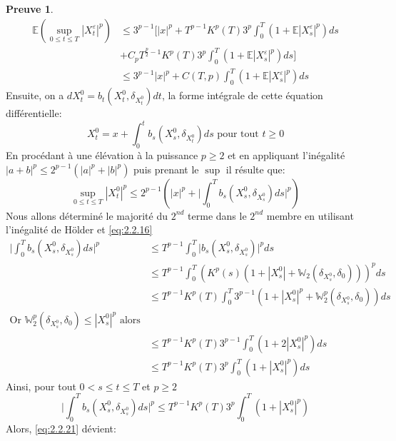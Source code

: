 \documentclass[12pt,a4paper,twoside,fleqn]{book}%
\theoremstyle{definition}
\newtheorem*{pr}{\textbf{Preuve}}
\theoremstyle{lemme}
\numberwithin{equation}{section}
\begin{document}
\begin{pr}
\begin{equation}\label{eq:2.2.20}
\begin{aligned}
\mathbb{E}\left(\sup_{0\leq t \leq T}|X_t^\varepsilon|^p\right) &\leq 3^{p-1}\Big[|x|^p +T^{p-1}K^p(T)3^{p}\int_{0}^{T}\left(1 + \mathbb{E}|X_s^\varepsilon|^p\right)ds\\&+  C_p T^{\frac{p}{2}-1}K^p(T)3^{p}\int_{0}^{T}\left(1 + \mathbb{E}|X_s^\varepsilon|^p\right)ds \Big]\\
&\leq  3^{p-1}|x|^p + C(T,p)\int_{0}^{T}\left(1 + \mathbb{E}|X_s^\varepsilon|^p\right)ds
\end{aligned}
\end{equation}
Ensuite, on a $ dX_t^0 = b_t(X_t^0,\delta_{X_t^0})dt$, la forme intégrale de cette équation différentielle:
\[
X_t^0 = x + \int_{0}^{t}b_s(X_s^0,\delta_{X_t^0})ds\text{ pour tout $t\geq 0$}
\]
En procédant à une élévation à la puissance $p\geq 2$ et en appliquant l'inégalité $|a+b|^p\leq 2^{p-1}(|a|^p + |b|^p)$ puis prenant le $\sup $ il résulte que:
\begin{equation}\label{eq:2.2.21}
	\sup_{0\leq t \leq T}|X_t^0|^p \leq 2^{p-1}\left(|x|^p + \Big|\int_{0}^{T}b_s(X_s^0,\delta_{X_s^0})ds\Big|^p\right)
\end{equation}
Nous allons déterminé le majorité du $2^{nd}$ terme dans le $2^{nd}$ membre en utilisant l'inégalité de Hölder et \ref{eq:2.2.16}
\[
\begin{aligned}
\Big|\int_{0}^{T}b_s(X_s^0,\delta_{X_s^0})ds\Big|^p&\leq T^{p-1}\int_{0}^{T}\Big|b_s(X_s^0,\delta_{X_s^0})\Big|^p ds\\
&\leq  T^{p-1}\int_{0}^{T}\left(K^p(s)(1 +|X_s^0| + \mathbb{W}_2(\delta_{X_s^0},\delta_0))\right)^pds\\
&\leq  T^{p-1}K^p(T)\int_{0}^{T}3^{p-1}\left(1 + |X_s^0|^p + \mathbb{W}_2^p(\delta_{X_s^0},\delta_0)\right)ds\\
\text{Or $\mathbb{W}_2^p(\delta_{X_s^0},\delta_0)\leq |X_s^0|^p$} \text{ alors}\\
&\leq T^{p-1}K^p(T)3^{p-1}\int_{0}^{T} \left(1 + 2|X_s^0|^p\right)ds\\
& \leq T^{p-1}K^p(T)3^{p}\int_{0}^{T} \left(1 + |X_s^0|^p\right)ds
\end{aligned}
\]
Ainsi, pour tout $0< s\leq t\leq T$ et $p\geq2$
\[
	\Big|\int_{0}^{T}b_s(X_s^0,\delta_{X_s^0})ds\Big|^p\leq T^{p-1}K^p(T)3^{p}\int_{0}^{T} \left(1+|X_s^0|^p\right)
\]
Alors, \ref{eq:2.2.21} dévient:
\begin{equation}
\begin{aligned}\label{eq:2.2.22}

\end{aligned}
\end{equation}
\end{pr}
\end{document}
